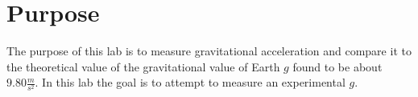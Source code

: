 \chapter{Purpose}

  The purpose of this lab is to measure gravitational acceleration and compare 
it to the theoretical value of the gravitational value of Earth $g$ found to 
be about $9.80\frac{m}{s^2}$. In this lab the goal is to attempt to measure 
an experimental $g$.
